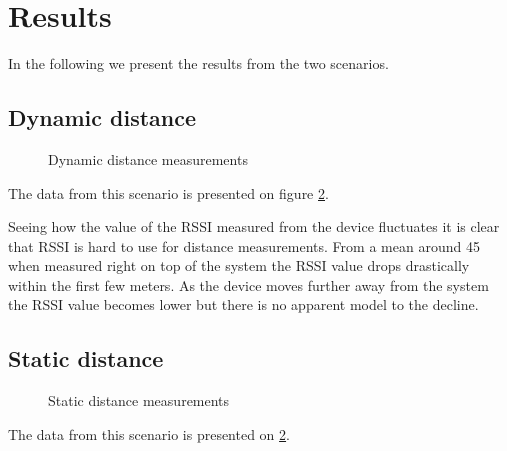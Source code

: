 \section{Results}
\label{sec_results}

In the following we present the results from the two scenarios.

\subsection{Dynamic distance}
%
%
%
%
%

\begin{figure}		
	
	
	
	\caption{ Dynamic distance measurements }
	\label{graf_InsideMesurements}
	
\end{figure}


The data from this scenario is presented on figure \cref{graf_InsideMesurements}.

Seeing how the value of the RSSI measured from the device fluctuates it is clear that RSSI is hard to use for distance measurements. From a mean around 45 when measured right on top of the system the RSSI value drops drastically within the first few meters. As the device moves further away from the system the RSSI value becomes lower but there is no apparent model to the decline.

\subsection{Static distance}


\begin{figure}
	
	
	\caption{Static distance measurements}
	\label{graf_InsideMesurements}
\end{figure}


The data from this scenario is presented on \cref{graf_InsideMesurements}. 



